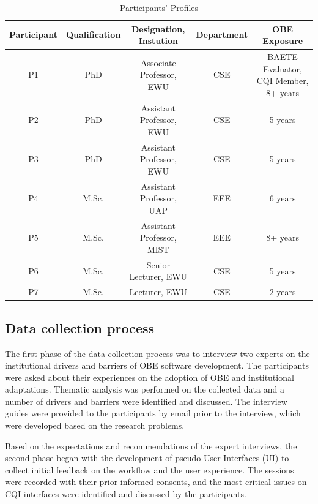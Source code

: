 \documentclass[journal,onecolumn]{IEEEtran}
\begin{document}
\begin{table}[ht]
    \centering
\caption{Participants’ Profiles}
\label{tab:participant_profiles}
    \begin{tabular}{|c|c|c|c|c|} \hline 
         \textbf{Participant}&  \textbf{Qualification}&  \textbf{Designation, Instution}&  \textbf{Department}&\textbf{OBE Exposure}\\ \hline 
         P1&  PhD&  Associate Professor, EWU&  CSE&BAETE Evaluator, CQI Member, 8+ years\\ \hline 
         P2&  PhD&  Assistant Professor, EWU&  CSE&5 years\\ \hline 
         P3&  PhD&  Assistant Professor, EWU&  CSE&5 years\\ \hline 
         P4&  M.Sc.&  Assistant Professor, UAP&  EEE&6 years\\ \hline 
         P5&  M.Sc.&  Assistant Professor, MIST&  EEE&8+ years\\ \hline 
         P6&  M.Sc.&  Senior Lecturer, EWU&  CSE&5 years\\ \hline 
         P7&  M.Sc.&  Lecturer, EWU&  CSE&2 years\\ \hline
    \end{tabular}
    
    
\end{table}





\subsection{Data collection process}

The first phase of the data collection process was to interview two experts on the institutional drivers and barriers of OBE software development. The participants were asked about their experiences on the adoption of OBE and institutional adaptations. Thematic analysis was performed on the collected data and a number of drivers and barriers were identified and discussed. The interview guides were provided to the participants by email prior to the interview, which were developed based on the research problems. 

Based on the expectations and recommendations of the expert interviews, the second phase began with the development of pseudo User Interfaces (UI) to collect initial feedback on the workflow and the user experience. The sessions were recorded with their prior informed consents, and the most critical issues on CQI interfaces were identified and discussed by the participants.  
\end{document}
